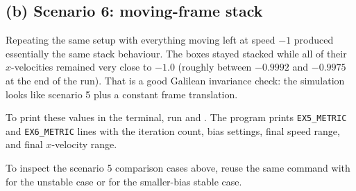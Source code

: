 \documentclass[11pt]{article}
\begin{document}
\subsection*{(b) Scenario 6: moving-frame stack}
Repeating the same setup with everything moving left at speed $-1$ produced essentially the same stack behaviour. The boxes stayed stacked while all of their $x$-velocities remained very close to $-1.0$ (roughly between $-0.9992$ and $-0.9975$ at the end of the run). That is a good Galilean invariance check: the simulation looks like scenario 5 plus a constant frame translation.

To print these values in the terminal, run
\texttt{} and \texttt{}. The program prints \texttt{EX5\_METRIC} and \texttt{EX6\_METRIC} lines with the iteration count, bias settings, final speed range, and final $x$-velocity range.

To inspect the scenario 5 comparison cases above, reuse the same command with \texttt{} for the unstable case or \texttt{} for the smaller-bias stable case.
\end{document}
